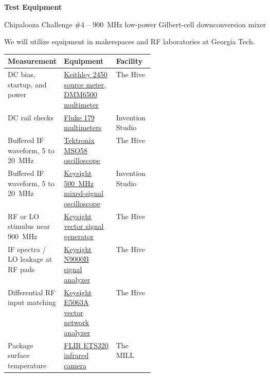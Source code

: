 \documentclass[11pt,letterpaper]{article}
\begin{document}
\raggedright

{\LARGE\bfseries Test Equipment\par}
{\large Chipalooza Challenge \#4 -- 900~MHz low-power Gilbert-cell downconversion mixer\par}

We will utilize equipment in makerspaces and RF laboratories at Georgia Tech.

\smallskip
\begingroup
\small
\renewcommand{\arraystretch}{1.23}
\begin{tabularx}{\linewidth}{@{}>{\raggedright\arraybackslash}p{0.33\linewidth}
                                >{\raggedright\arraybackslash}X l@{}}
\toprule
\textbf{Measurement} & \textbf{Equipment} & \textbf{Facility} \\
\midrule
DC bias, startup, and power &
    \href{https://wiki.hivemakerspace.com/explore/electronics-benchtop/}{Keithley 2450 source meter}, \href{https://wiki.hivemakerspace.com/explore/electronics-benchtop/}{DMM6500 multimeter} & The Hive \\
DC rail checks &
    \href{https://inventionstudio.gatech.edu/tools-equipment/electronics/}{Fluke 179 multimeters} & Invention Studio \\
Buffered IF waveform, 5 to 20~MHz &
    \href{https://wiki.hivemakerspace.com/explore/electronics-benchtop/}{Tektronix MSO58 oscilloscope} & The Hive \\
Buffered IF waveform, 5 to 20~MHz &
    \href{https://inventionstudio.gatech.edu/tools-equipment/electronics/}{Keysight 500~MHz mixed-signal oscilloscope} & Invention Studio \\
RF or LO stimulus near 900~MHz &
    \href{https://wiki.hivemakerspace.com/explore/electronics-benchtop/}{Keysight vector signal generator} & The Hive \\
IF spectra / LO leakage at RF pads &
    \href{https://wiki.hivemakerspace.com/explore/electronics-benchtop/}{Keysight N9000B signal analyzer} & The Hive \\
Differential RF input matching &
    \href{https://wiki.hivemakerspace.com/explore/electronics-benchtop/}{Keysight E5063A vector network analyzer} & The Hive \\
Package surface temperature &
    \href{https://mill.mse.gatech.edu/equipment/measurement-team/}{FLIR ETS320 infrared camera} & The MILL \\
\bottomrule
\end{tabularx}
\endgroup

\end{document}
